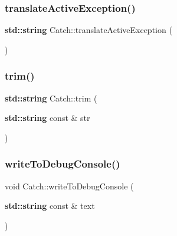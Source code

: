 \mbox{\label{namespace_catch_adafff91485eeeeb9e9333f317cc0e3b1}} 
\subsubsection{\texorpdfstring{translate\+Active\+Exception()}{translateActiveException()}}
{\footnotesize\ttfamily \textbf{ std\+::string} Catch\+::translate\+Active\+Exception (\begin{DoxyParamCaption}{ }\end{DoxyParamCaption})}

\mbox{\label{namespace_catch_a084108b47f37d8bfd5db51c50c7451b3}} 
\subsubsection{\texorpdfstring{trim()}{trim()}}
{\footnotesize\ttfamily \textbf{ std\+::string} Catch\+::trim (\begin{DoxyParamCaption}\item[{\textbf{ std\+::string} const \&}]{str }\end{DoxyParamCaption})}

\mbox{\label{namespace_catch_aa5dcf4750ce9a854f4b74d3c952d13cc}} 
\subsubsection{\texorpdfstring{write\+To\+Debug\+Console()}{writeToDebugConsole()}}
{\footnotesize\ttfamily void Catch\+::write\+To\+Debug\+Console (\begin{DoxyParamCaption}\item[{\textbf{ std\+::string} const \&}]{text }\end{DoxyParamCaption})}

